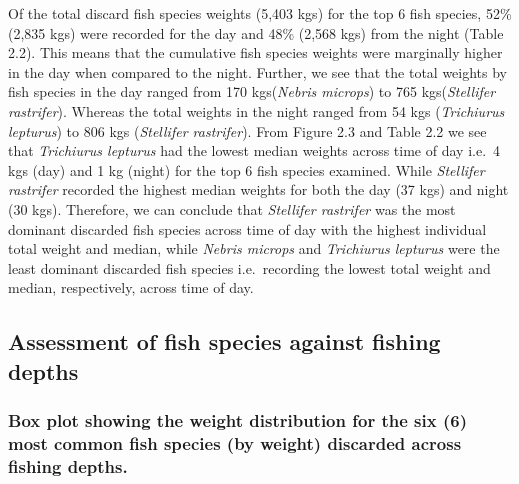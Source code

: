 \documentclass[
]{book}
\begin{document}
Of the total discard fish species weights (5,403 kgs) for the top 6 fish species, 52\% (2,835 kgs) were recorded for the day and 48\% (2,568 kgs) from the night (Table 2.2). This means that the cumulative fish species weights were marginally higher in the day when compared to the night. Further, we see that the total weights by fish species in the day ranged from 170 kgs(\emph{Nebris microps}) to 765 kgs(\emph{Stellifer rastrifer}). Whereas the total weights in the night ranged from 54 kgs (\emph{Trichiurus lepturus}) to 806 kgs (\emph{Stellifer rastrifer}). From Figure 2.3 and Table 2.2 we see that \emph{Trichiurus lepturus} had the lowest median weights across time of day i.e.~4 kgs (day) and 1 kg (night) for the top 6 fish species examined. While \emph{Stellifer rastrifer} recorded the highest median weights for both the day (37 kgs) and night (30 kgs). Therefore, we can conclude that \emph{Stellifer rastrifer} was the most dominant discarded fish species across time of day with the highest individual total weight and median, while \emph{Nebris microps} and \emph{Trichiurus lepturus} were the least dominant discarded fish species i.e.~recording the lowest total weight and median, respectively, across time of day.

\hypertarget{assessment-of-fish-species-against-fishing-depths}{%
\subsection{Assessment of fish species against fishing depths}\label{assessment-of-fish-species-against-fishing-depths}}

\hypertarget{box-plot-showing-the-weight-distribution-for-the-six-6-most-common-fish-species-by-weight-discarded-across-fishing-depths.}{%
\subsubsection{Box plot showing the weight distribution for the six (6) most common fish species (by weight) discarded across fishing depths.}\label{box-plot-showing-the-weight-distribution-for-the-six-6-most-common-fish-species-by-weight-discarded-across-fishing-depths.}}
\end{document}
